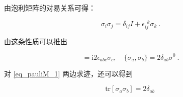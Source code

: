 由泡利矩阵的对易关系可得：
\begin{theorem}{}
\begin{equation}\label{eq_pauliM_1}
\sigma_i\sigma_j = \delta_{ij}I + \epsilon ^{\,\,\, k}_{ij}\sigma_k~.
\end{equation}
\end{theorem}


由这条性质可以推出
\begin{lemma}{}
\begin{equation}
[\sigma_a,\sigma_b] = \mathrm{i}2\epsilon_{abc}\sigma_c,\quad \{\sigma_a,\sigma_b\}=2\delta_{ab}\sigma^0~.
\end{equation}
\end{lemma}
对 \autoref{eq_pauliM_1} 两边求迹，还可以得到
\begin{lemma}{}
\begin{equation}
\mathrm{tr}[\sigma_a \sigma_b]= 2\delta_{ab} ~
\end{equation}
\end{lemma}
